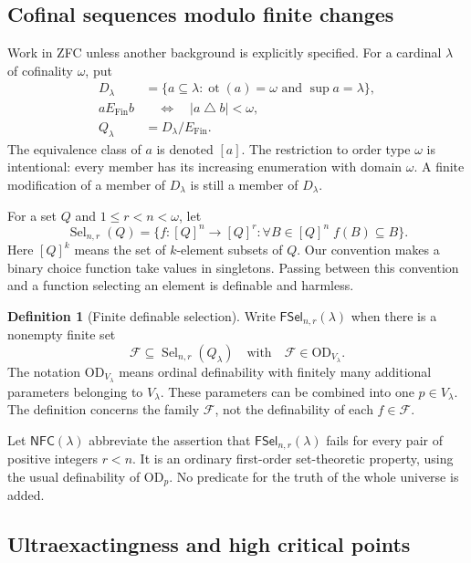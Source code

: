 \documentclass[11pt,letterpaper]{article}
\theoremstyle{definition}
\newtheorem{definition}{Definition}[section]
\newcommand{\OD}{\mathrm{OD}}
\newcommand{\ot}{\operatorname{ot}}
\newcommand{\Sel}{\operatorname{Sel}}
\newcommand{\Fin}{\operatorname{Fin}}
\newcommand{\FSel}{\mathsf{FSel}}
\newcommand{\FF}{\mathscr F}
\newcommand{\NFC}{\mathsf{NFC}}
\begin{document}
\subsection{Cofinal sequences modulo finite changes}

Work in ZFC unless another background is explicitly specified. For a cardinal $\lambda$ of cofinality $\omega$, put
\begin{align}
 D_\lambda&=\{a\subseteq\lambda:\ot(a)=\omega\text{ and }\sup a=\lambda\},\\
 a\mathrel{E_{\Fin}}b&\quad\Longleftrightarrow\quad |a\mathbin{\triangle}b|<\omega,\\
 Q_\lambda&=D_\lambda/E_{\Fin}.
 \label{eq:quotient}
\end{align}
The equivalence class of $a$ is denoted $[a]$. The restriction to order type $\omega$ is intentional: every member has its increasing enumeration with domain $\omega$. A finite modification of a member of $D_\lambda$ is still a member of $D_\lambda$.

For a set $Q$ and $1\leq r<n<\omega$, let
\begin{equation}\label{eq:sel}
 \Sel_{n,r}(Q)=
 \{f:[Q]^n\to[Q]^r:\forall B\in[Q]^n\;f(B)\subseteq B\}.
\end{equation}
Here $[Q]^k$ means the set of $k$-element subsets of $Q$. Our convention makes a binary choice function take values in singletons. Passing between this convention and a function selecting an element is definable and harmless.

\begin{definition}[Finite definable selection]\label{def:fsel}
Write $\FSel_{n,r}(\lambda)$ when there is a nonempty finite set
\[
 \FF\subseteq\Sel_{n,r}(Q_\lambda)
 \quad\text{with}\quad \FF\in\OD_{V_\lambda}.
\]
The notation $\OD_{V_\lambda}$ means ordinal definability with finitely many additional parameters belonging to $V_\lambda$. These parameters can be combined into one $p\in V_\lambda$. The definition concerns the family $\FF$, not the definability of each $f\in\FF$.
\end{definition}

Let $\NFC(\lambda)$ abbreviate the assertion that $\FSel_{n,r}(\lambda)$ fails for every pair of positive integers $r<n$. It is an ordinary first-order set-theoretic property, using the usual definability of $\OD_p$. No predicate for the truth of the whole universe is added.

\subsection{Ultraexactingness and high critical points}
\end{document}
